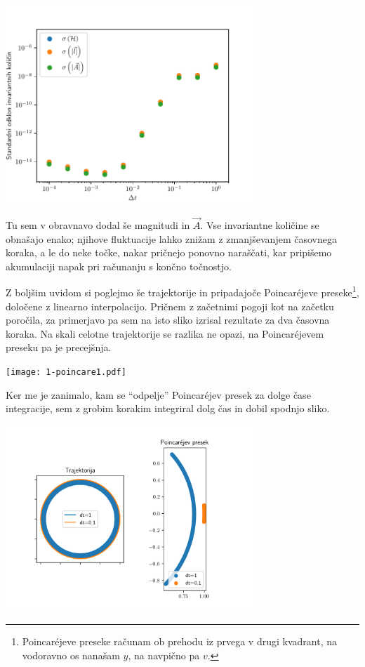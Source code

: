 \begin{center}
     \includegraphics[width=0.7\textwidth]{1-stds.pdf}
\end{center}

Tu sem v obravnavo dodal še magnitudi \LL{} in $\vec{A}$. Vse invariantne količine se obnašajo enako; njihove fluktuacije lahko znižam z zmanjševanjem časovnega koraka, a le do neke točke, nakar pričnejo ponovno naraščati, kar pripišemo akumulaciji napak pri računanju s končno točnostjo.

\begin{samepage}
Z boljšim uvidom si poglejmo še trajektorije in pripadajoče Poincaréjeve preseke\footnote{Poincaréjeve preseke računam ob prehodu iz prvega v drugi kvadrant, na vodoravno os nanašam $y$, na navpično pa $v$. }, določene z linearno interpolacijo. Pričnem z začetnimi pogoji kot na začetku poročila, za primerjavo pa sem na isto sliko izrisal rezultate za dva časovna koraka. Na skali celotne trajektorije se razlika ne opazi, na Poincaréjevem preseku pa je precejšnja.

\begin{center}
     \texttt{[image: 1-poincare1.pdf]}
\end{center}
\end{samepage}

 Ker me je zanimalo, kam se ``odpelje'' Poincaréjev presek za dolge čase integracije, sem z grobim korakim integriral dolg čas in dobil spodnjo sliko. 
\begin{center}
     \includegraphics[width=0.7\textwidth]{1-poincare1-1.png}
\end{center}


